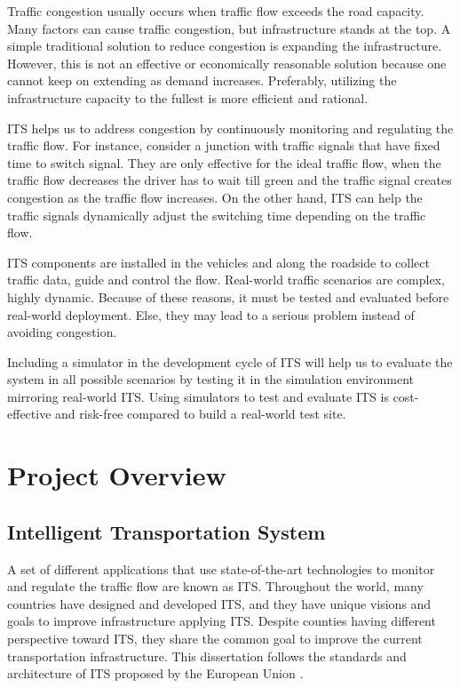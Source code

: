 Traffic congestion usually occurs when traffic flow exceeds the road capacity. Many factors can cause traffic congestion, but infrastructure stands at the top.  A simple traditional solution to reduce congestion is expanding the infrastructure. However, this is not an effective or economically reasonable solution because one cannot keep on extending as demand increases. Preferably, utilizing the infrastructure capacity to the fullest is more efficient and rational. 

ITS helps us to address congestion by continuously monitoring and regulating the traffic flow. For instance, consider a junction with traffic signals that have fixed time to switch signal. They are only effective for the ideal traffic flow, when the traffic flow decreases
the driver has to wait till green and the traffic signal creates congestion as the traffic flow increases. On the other hand, ITS can help the traffic signals dynamically adjust the switching time depending on the traffic flow.

ITS components are installed in the vehicles and along the roadside to collect traffic data, guide and control the flow. Real-world traffic scenarios are complex, highly dynamic. Because of these reasons, it must be tested and evaluated before real-world deployment. Else, they may lead to a serious problem instead of avoiding congestion. 

Including a simulator in the development cycle of ITS will help us to evaluate the system in all possible scenarios by testing it in the simulation environment mirroring real-world ITS.  Using simulators to test and evaluate ITS is cost-effective and risk-free compared to build a real-world test site.

\section{Project Overview}
\subsection{Intelligent Transportation System}
A set of different applications that use state-of-the-art technologies to monitor and regulate the traffic flow are known as ITS. Throughout the world, many countries have designed and developed ITS, and they have unique visions and goals to improve infrastructure applying ITS. Despite counties having different perspective toward ITS, they share the common goal to improve the current transportation infrastructure. This dissertation follows the standards and architecture of ITS proposed by the European Union \cite{etsi}.


